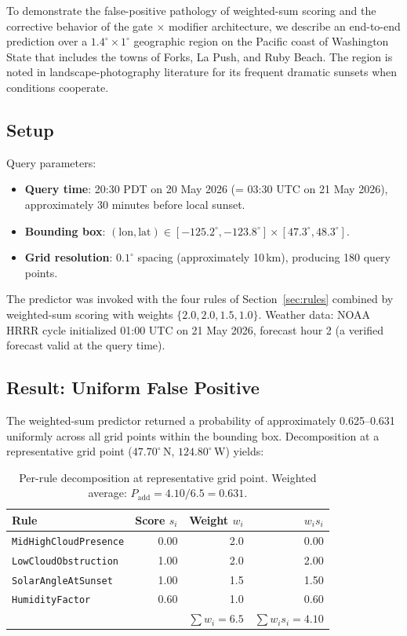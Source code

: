 \documentclass[11pt,a4paper]{article}
\begin{document}
To demonstrate the false-positive pathology of weighted-sum scoring and the corrective behavior of the gate $\times$ modifier architecture, we describe an end-to-end prediction over a $1.4^\circ \times 1^\circ$ geographic region on the Pacific coast of Washington State that includes the towns of Forks, La Push, and Ruby Beach. The region is noted in landscape-photography literature for its frequent dramatic sunsets when conditions cooperate.

\subsection{Setup}

Query parameters:
\begin{itemize}
\item \textbf{Query time}: 20:30 PDT on 20 May 2026 (= 03:30 UTC on 21 May 2026), approximately 30 minutes before local sunset.
\item \textbf{Bounding box}: $(\text{lon}, \text{lat}) \in [-125.2^\circ, -123.8^\circ] \times [47.3^\circ, 48.3^\circ]$.
\item \textbf{Grid resolution}: $0.1^\circ$ spacing (approximately 10\,km), producing 180 query points.
\end{itemize}

The predictor was invoked with the four rules of Section~\ref{sec:rules} combined by weighted-sum scoring with weights $\{2.0, 2.0, 1.5, 1.0\}$. Weather data: NOAA HRRR cycle initialized 01:00 UTC on 21 May 2026, forecast hour 2 (a verified forecast valid at the query time).

\subsection{Result: Uniform False Positive}

The weighted-sum predictor returned a probability of approximately 0.625--0.631 uniformly across all grid points within the bounding box. Decomposition at a representative grid point ($47.70^\circ$\,N, $124.80^\circ$\,W) yields:

\begin{table}[H]
\centering
\small
\begin{tabular}{lrrr}
\toprule
Rule & Score $s_i$ & Weight $w_i$ & $w_i s_i$ \\
\midrule
\texttt{MidHighCloudPresence} & 0.00 & 2.0 & 0.00 \\
\texttt{LowCloudObstruction} & 1.00 & 2.0 & 2.00 \\
\texttt{SolarAngleAtSunset} & 1.00 & 1.5 & 1.50 \\
\texttt{HumidityFactor} & 0.60 & 1.0 & 0.60 \\
\midrule
& & $\sum w_i = 6.5$ & $\sum w_i s_i = 4.10$ \\
\bottomrule
\end{tabular}
\caption{Per-rule decomposition at representative grid point. Weighted average: $P_{\text{add}} = 4.10 / 6.5 = 0.631$.}
\label{tab:casestudy_decomp}
\end{table}
\end{document}
